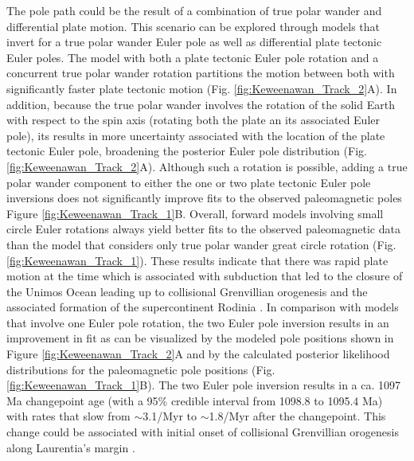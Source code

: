 \documentclass[11pt,letterpaper]{article}
\begin{document}
The pole path could be the result of a combination of true polar wander and differential plate motion. This scenario can be explored through models that invert for a true polar wander Euler pole as well as differential plate tectonic Euler poles. The model with both a plate tectonic Euler pole rotation and a concurrent true polar wander rotation partitions the motion between both with significantly faster plate tectonic motion (Fig. \ref{fig:Keweenawan_Track_2}A). In addition, because the true polar wander involves the rotation of the solid Earth with respect to the spin axis (rotating both the plate an its associated Euler pole), its results in more uncertainty associated with the location of the plate tectonic Euler pole, broadening the posterior Euler pole distribution (Fig. \ref{fig:Keweenawan_Track_2}A). Although such a rotation is possible, adding a true polar wander component to either the one or two plate tectonic Euler pole inversions does not significantly improve fits to the observed paleomagnetic poles Figure \ref{fig:Keweenawan_Track_1}B. Overall, forward models involving small circle Euler rotations always yield better fits to the observed paleomagnetic data than the model that considers only true polar wander great circle rotation (Fig. \ref{fig:Keweenawan_Track_1}). These results indicate that there was rapid plate motion at the time which is associated with subduction that led to the closure of the Unimos Ocean leading up to collisional Grenvillian orogenesis and the associated formation of the supercontinent Rodinia \citep{Hynes2010a, Swanson-Hysell2022a}. In comparison with models that involve one Euler pole rotation, the two Euler pole inversion results in an improvement in fit as can be visualized by the modeled pole positions shown in Figure \ref{fig:Keweenawan_Track_2}A and by the calculated posterior likelihood distributions for the paleomagnetic pole positions (Fig. \ref{fig:Keweenawan_Track_1}B). The two Euler pole inversion results in a ca. 1097 Ma changepoint age (with a 95\% credible interval from 1098.8 to 1095.4 Ma) with rates that slow from $\sim$3.1\textdegree /Myr to $\sim$1.8\textdegree /Myr after the changepoint. This change could be associated with initial onset of collisional Grenvillian orogenesis along Laurentia's margin \citep{Swanson-Hysell2019a}.
\end{document}
